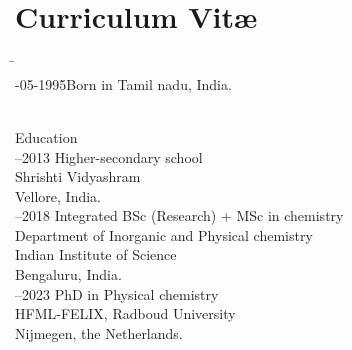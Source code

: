 \chapter{Curriculum Vit\ae}
\makeatletter
\authors{\@firstnames\ {\titleshape\@lastname}}
\makeatother

\newcommand{\fakeSection}[1]{\\[\bigskipamount]
{\normalfont\sectfont\usekomafont{section}#1}
\\[\smallskipamount]}
\begin{tabbing}
    \hspace{1em}\=\hspace{8em}\=\\
    -05-1995\>Born in Tamil nadu, India.%

    \fakeSection{Education}
    
    --2013 \> Higher-secondary school \\
    \>\> Shrishti Vidyashram\\
    \>\> Vellore, India.\\[\medskipamount]

    --2018\> Integrated BSc (Research) + MSc in chemistry \\
    \>\> Department of Inorganic and Physical chemistry \\
    \>\> Indian Institute of Science \\
    \>\> Bengaluru, India.\\[\medskipamount]
    
    --2023\> PhD in Physical chemistry\\
    \>\> HFML-FELIX, Radboud University \\
    \>\> Nijmegen, the Netherlands.\\[\medskipamount]
    
\end{tabbing}
